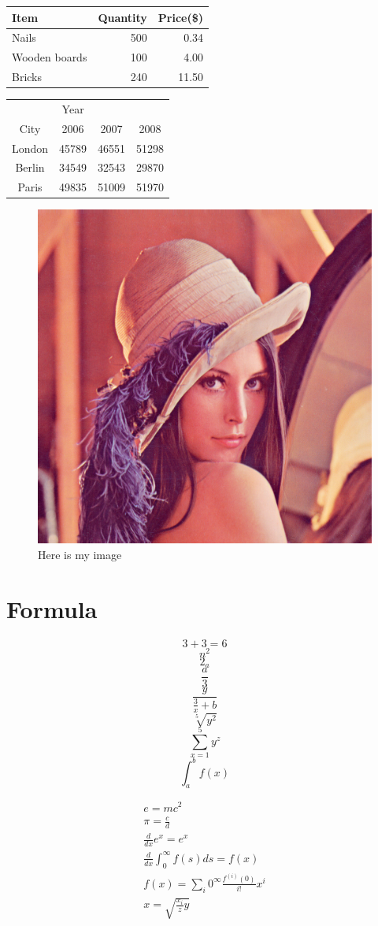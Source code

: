 \documentclass[a4paper,12pt]{article}
\begin{document}
\begin{tabular}{|l|r|r|}
	Item & Quantity & Price(\$) \\
	\hline
	Nails & 500 & 0.34 \\
	Wooden boards & 100 & 4.00 \\
	Bricks & 240 & 11.50 \\
\end{tabular}
	
	
\begin{tabular}{c|ccc}
	& Year &  & \\
	\cline{2-4}
	City & 2006 & 2007 & 2008 \\
	\hline
	London & 45789 & 46551 & 51298 \\
	Berlin & 34549 & 32543 & 29870 \\
	Paris & 49835 & 51009 & 51970 \\
\end{tabular}


\begin{figure}[h]
	\centering
	\includegraphics[width=1\textwidth]{lena}
	\caption{Here is my image}
	\label{image-myimage}
\end{figure}


\section{Formula}

\[3 + 3 = 6\]
\[n^2\]
\[2_a\]
\[\frac{a}{3}\]
\[\frac{y}{\frac{3}{x} + b}\]
\[\sqrt[5]{y^2}\]
\[\sum_{x=1}^5 y^z\]
\[\int_a^b f(x)\]


\begin{align}
	e = mc^2 \\
	\pi = \frac{c}{d} \\
	\frac{d}{dx}e^x = e^x \\
	\frac{d}{dx}\int_0^\infty f(s)ds = f(x) \\
	f(x) = \sum_i0^\infty \frac{f^(i)(0)}{i!} x^i \\
	x = \sqrt{\frac{x_i}{z} y}
\end{align}
\end{document}
